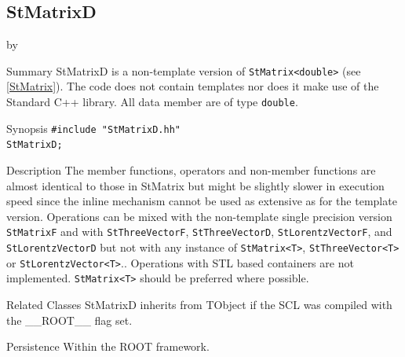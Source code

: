\documentclass[twoside]{article}
\newcommand{\name}[1]{\textsf{#1}}%
\newcommand{\entrylabel}[1]{\mbox{\textbf{{#1}}}\hfil}%
\newenvironment{entry}
{\begin{list}{}%
    {\renewcommand{\makelabel}{\entrylabel}%
     \setlength{\labelwidth}{90pt}%
     \setlength{\leftmargin}{\labelwidth}
     \advance\leftmargin by \labelsep%
      }%
    }%
  {\end{list}}
\newcommand{\Entrylabel}[1]%
{\raisebox{0pt}[1ex][0pt]{\makebox[\labelwidth][l]%
    {\parbox[t]{\labelwidth}{\hspace{0pt}\textbf{{#1}}}}}}
\newenvironment{Entry}%
{\renewcommand{\entrylabel}{\Entrylabel}\begin{entry}}%
  {\end{entry}}
\begin{document}
\subsection{StMatrixD } \label{StMatrixD}
\begin{Entry}
\item[Summary]
    StMatrixD is a non-template version of \verb+StMatrix<double>+
    (see \ref{StMatrix}). The code does not contain templates nor
    does it make use of the Standard C++ library. All data member are of
    type \texttt{double}.
    
\item[Synopsis]
    \verb+#include "StMatrixD.hh"+ \\
    \verb+StMatrixD;+
    
    
\item[Description]       
    The member functions, operators and non-member functions are almost identical
    to those in StMatrix but might be slightly slower in execution speed
    since the inline mechanism cannot be used as extensive as for the template
    version. Operations can be mixed with the non-template single precision version
    \texttt{StMatrixF} and with \texttt{StThreeVectorF}, \texttt{StThreeVectorD},
    \texttt{StLorentzVectorF}, and \texttt{StLorentzVectorD}
    but not with any instance of \verb+StMatrix<T>+, \verb+StThreeVector<T>+ or
    \verb+StLorentzVector<T>+..
    Operations with STL based containers are not implemented.
    \verb+StMatrix<T>+ should be preferred where possible.

\item[Related Classes]
    StMatrixD inherits from TObject 
    if the SCL was compiled with the \name{\_\_ROOT\_\_} flag set.

\item[Persistence]
    Within the ROOT framework.


\end{Entry}

%
%
\end{document}

